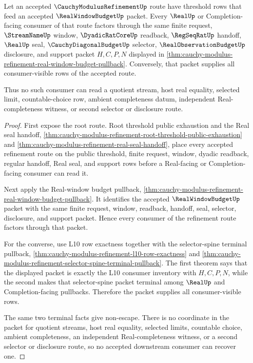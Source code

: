 \begin{theorem}
\label{thm:cauchy-modulus-refinement-real-window-budget-terminality}
Let an accepted $\CauchyModulusRefinementUp$ route have threshold rows that
feed an accepted $\RealWindowBudgetUp$ packet. Every $\RealUp$ or
Completion-facing consumer of that route factors through the same finite
request, $\StreamNameUp$ window, $\DyadicRatCoreUp$ readback,
$\RegSeqRatUp$ handoff, $\RealUp$ seal, $\CauchyDiagonalBudgetUp$ selector,
$\RealObservationBudgetUp$ disclosure, and support packet $H,C,P,N$ displayed
in \autoref{thm:cauchy-modulus-refinement-real-window-budget-pullback}.
Conversely, that packet supplies all consumer-visible rows of the accepted
route.

Thus no such consumer can read a quotient stream, host real equality,
selected limit, countable-choice row, ambient completeness datum, independent
Real-completeness witness, or second selector or disclosure route.
\end{theorem}
\begin{proof}
First expose the root route. Root threshold public exhaustion and the Real
seal handoff,
\autoref{thm:cauchy-modulus-refinement-root-threshold-public-exhaustion} and
\autoref{thm:cauchy-modulus-refinement-real-seal-handoff}, place every
accepted refinement route on the public threshold, finite request, window,
dyadic readback, regular handoff, Real seal, and support rows before a
Real-facing or Completion-facing consumer can read it.

Next apply the Real-window budget pullback,
\autoref{thm:cauchy-modulus-refinement-real-window-budget-pullback}. It
identifies the accepted $\RealWindowBudgetUp$ packet with the same finite
request, window, readback, handoff, seal, selector, disclosure, and support
packet. Hence every consumer of the refinement route factors through that
packet.

For the converse, use L10 row exactness together with the selector-spine
terminal pullback,
\autoref{thm:cauchy-modulus-refinement-l10-row-exactness} and
\autoref{thm:cauchy-modulus-refinement-selector-spine-terminal-pullback}.
The first theorem says that the displayed packet is exactly the L10 consumer
inventory with $H,C,P,N$, while the second makes that selector-spine packet
terminal among $\RealUp$ and Completion-facing pullbacks. Therefore the packet
supplies all consumer-visible rows.

The same two terminal facts give non-escape. There is no coordinate in the
packet for quotient streams, host real equality, selected limits, countable
choice, ambient completeness, an independent Real-completeness witness, or a
second selector or disclosure route, so no accepted downstream consumer can
recover one.
\end{proof}

